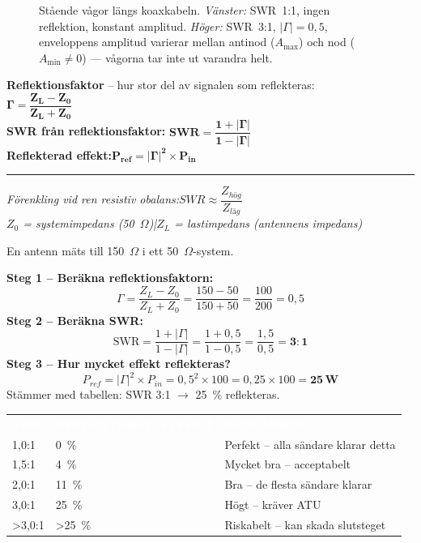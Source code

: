 \documentclass[a4paper,11pt,twoside]{book}
\newcommand{\tblhdr}[1]{\cellcolor{greydark}\textcolor{white}{\headingfont\bfseries\footnotesize\MakeUppercase{#1}}}
\begin{document}
\begin{figure}[h]
\begin{tikzpicture}[x=1cm, y=1cm, font=\sffamily\small]
\end{tikzpicture}
\caption{Stående vågor längs koaxkabeln. \textit{Vänster:} SWR~1:1, ingen 
reflektion, konstant amplitud. \textit{Höger:} SWR~3:1, $|\Gamma|=0{,}5$, 
enveloppens amplitud varierar mellan antinod ($A_\text{max}$) och nod 
($A_\text{min}\neq 0$) — vågorna tar inte ut varandra helt.}
\label{fig:swr-envelope}
\end{figure}

\begin{formulabox}
\textbf{Reflektionsfaktor} -- hur stor del av signalen som reflekteras:\\[2mm]
{\large$\mathbf{\Gamma = \dfrac{Z_L - Z_0}{Z_L + Z_0}}$}
\\[3mm]
\textbf{SWR från reflektionsfaktor:}\quad
{\large$\mathbf{SWR = \dfrac{1 + |\Gamma|}{1 - |\Gamma|}}$}\\[3mm]
\textbf{Reflekterad effekt:}\quad$\mathbf{P_{ref} = |\Gamma|^2 \times P_{in}}$\\[3mm]
\hrule\vspace{2mm}
{\small\normalfont\itshape
Förenkling vid ren resistiv obalans:\quad$SWR \approx \dfrac{Z_{hög}}{Z_{låg}}$\\[1mm]
$Z_0$ = systemimpedans (50~$\Omega$)\quad|\quad$Z_L$ = lastimpedans (antennens impedans)}
\end{formulabox}

\begin{worked}[title={Räkneexempel -- $\Gamma$ och SWR från impedanser}]
En antenn mäts till 150~$\Omega$ i ett 50~$\Omega$-system.

\textbf{Steg 1 -- Beräkna reflektionsfaktorn:}
\[\Gamma = \frac{Z_L - Z_0}{Z_L + Z_0} = \frac{150 - 50}{150 + 50} = \frac{100}{200} = 0{,}5\]
\textbf{Steg 2 -- Beräkna SWR:}
\[\mathrm{SWR} = \frac{1 + |\Gamma|}{1 - |\Gamma|} = \frac{1 + 0{,}5}{1 - 0{,}5} = \frac{1{,}5}{0{,}5} = \mathbf{3{:}1}\]
\textbf{Steg 3 -- Hur mycket effekt reflekteras?}
\[P_{ref} = |\Gamma|^2 \times P_{in} = 0{,}5^2 \times 100 = 0{,}25 \times 100 = \mathbf{25\,\text{W}}\]
Stämmer med tabellen: SWR 3:1 $\rightarrow$ 25~\% reflekteras.~\checkmark
\end{worked}

\begin{center}
\begin{tabular}{L{2.2cm}L{2.8cm}L{4.5cm}}
\tblhdr{SWR} & \tblhdr{Reflekterad effekt} & \tblhdr{Bedömning} \\
1{,}0:1 & 0~\% & Perfekt -- alla sändare klarar detta \\
1{,}5:1 & 4~\% & Mycket bra -- acceptabelt \\
2{,}0:1 & 11~\% & Bra -- de flesta sändare klarar \\
3{,}0:1 & 25~\% & Högt -- kräver ATU \\
>3{,}0:1 & >25~\% & Riskabelt -- kan skada slutsteget \\
\end{tabular}
\end{center}
\end{document}

